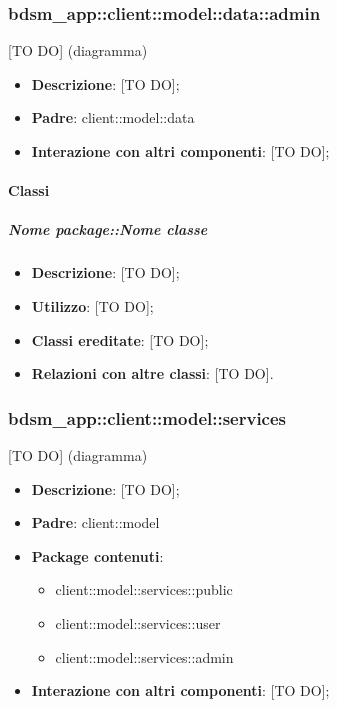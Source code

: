 \subsubsection{bdsm\_app::client::model::data::admin} %
\label{ssub:bdsm_app_client_model_data_admin}
[TO DO] (diagramma) \newline \newline

\begin{itemize}
	\item \textbf{Descrizione}: [TO DO];
	\item \textbf{Padre}: client::model::data
	\item \textbf{Interazione con altri componenti}: [TO DO];
\end{itemize}

	\paragraph{Classi} %
		\subparagraph{Nome package::Nome classe} %
		\label{subp:subparagraph_name}
			\begin{itemize}
				\item \textbf{Descrizione}: [TO DO];
				\item \textbf{Utilizzo}: [TO DO];
				\item \textbf{Classi ereditate}: [TO DO];
				\item \textbf{Relazioni con altre classi}: [TO DO].
			\end{itemize}	


\subsubsection{bdsm\_app::client::model::services} %
\label{ssub:bdsm_app_client_model_services}
[TO DO] (diagramma) \newline \newline

\begin{itemize}
	\item \textbf{Descrizione}: [TO DO];
	\item \textbf{Padre}: client::model
	\item \textbf{Package contenuti}:
		\begin{itemize}
			\item client::model::services::public
			\item client::model::services::user
			\item client::model::services::admin
		\end{itemize}
	\item \textbf{Interazione con altri componenti}: [TO DO];
\end{itemize}

